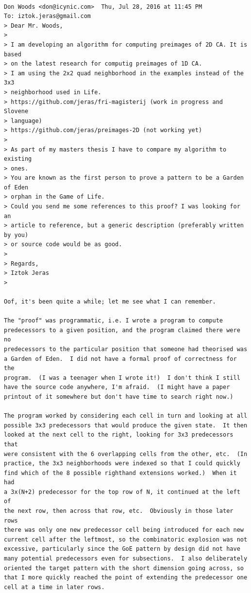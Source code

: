 \documentclass[12pt,a4paper,openany,twoside]{book}
\begin{document}
\begin{Verbatim}[fontsize=\small]

Don Woods <don@icynic.com>	Thu, Jul 28, 2016 at 11:45 PM
To: iztok.jeras@gmail.com
> Dear Mr. Woods,
>
> I am developing an algorithm for computing preimages of 2D CA. It is based
> on the latest research for computig preimages of 1D CA.
> I am using the 2x2 quad neighborhood in the examples instead of the 3x3
> neighborhood used in Life.
> https://github.com/jeras/fri-magisterij (work in progress and Slovene
> language)
> https://github.com/jeras/preimages-2D (not working yet)
>
> As part of my masters thesis I have to compare my algorithm to existing
> ones.
> You are known as the first person to prove a pattern to be a Garden of Eden
> orphan in the Game of Life.
> Could you send me some references to this proof? I was looking for an
> article to reference, but a generic description (preferably written by you)
> or source code would be as good.
>
> Regards,
> Iztok Jeras
>

Oof, it's been quite a while; let me see what I can remember.

The "proof" was programmatic, i.e. I wrote a program to compute
predecessors to a given position, and the program claimed there were no
predecessors to the particular position that someone had theorised was
a Garden of Eden.  I did not have a formal proof of correctness for the
program.  (I was a teenager when I wrote it!)  I don't think I still
have the source code anywhere, I'm afraid.  (I might have a paper
printout of it somewhere but don't have time to search right now.)

The program worked by considering each cell in turn and looking at all
possible 3x3 predecessors that would produce the given state.  It then
looked at the next cell to the right, looking for 3x3 predecessors that
were consistent with the 6 overlapping cells from the other, etc.  (In
practice, the 3x3 neighborhoods were indexed so that I could quickly
find which of the 8 possible righthand extensions worked.)  When it had
a 3x(N+2) predecessor for the top row of N, it continued at the left of
the next row, then across that row, etc.  Obviously in those later rows
there was only one new predecessor cell being introduced for each new
current cell after the leftmost, so the combinatoric explosion was not
excessive, particularly since the GoE pattern by design did not have
many potential predecessors even for subsections.  I also deliberately
oriented the target pattern with the short dimension going across, so
that I more quickly reached the point of extending the predecessor one
cell at a time in later rows.


\end{Verbatim}
\end{document}
